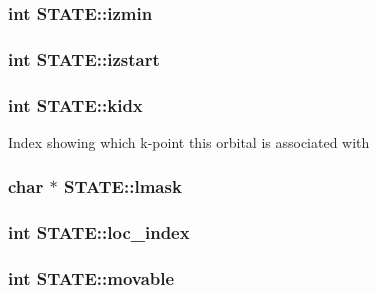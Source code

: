 \hypertarget{struct_s_t_a_t_e_a495ef2ace16d4fc498894d751044967a}{
\subsubsection[{izmin}]{\setlength{\rightskip}{0pt plus 5cm}int S\-T\-A\-T\-E\-::izmin}}\label{struct_s_t_a_t_e_a495ef2ace16d4fc498894d751044967a}
\hypertarget{struct_s_t_a_t_e_afbee51a629af4923533c7fe17fb51488}{
\subsubsection[{izstart}]{\setlength{\rightskip}{0pt plus 5cm}int S\-T\-A\-T\-E\-::izstart}}\label{struct_s_t_a_t_e_afbee51a629af4923533c7fe17fb51488}
\hypertarget{struct_s_t_a_t_e_ab2d8423cf507b9585d85f5b10a27326c}{
\subsubsection[{kidx}]{\setlength{\rightskip}{0pt plus 5cm}int S\-T\-A\-T\-E\-::kidx}}\label{struct_s_t_a_t_e_ab2d8423cf507b9585d85f5b10a27326c}
Index showing which k-\/point this orbital is associated with \hypertarget{struct_s_t_a_t_e_a64bc98507c0a1e0b485c1b5e29bf4595}{
\subsubsection[{lmask}]{\setlength{\rightskip}{0pt plus 5cm}char $\ast$ S\-T\-A\-T\-E\-::lmask}}\label{struct_s_t_a_t_e_a64bc98507c0a1e0b485c1b5e29bf4595}
\hypertarget{struct_s_t_a_t_e_acaca318767587e321bdc410210393e6f}{
\subsubsection[{loc\-\_\-index}]{\setlength{\rightskip}{0pt plus 5cm}int S\-T\-A\-T\-E\-::loc\-\_\-index}}\label{struct_s_t_a_t_e_acaca318767587e321bdc410210393e6f}
\hypertarget{struct_s_t_a_t_e_ab4a1a330cadb70247c06776140f60d29}{
\subsubsection[{movable}]{\setlength{\rightskip}{0pt plus 5cm}int S\-T\-A\-T\-E\-::movable}}\label{struct_s_t_a_t_e_ab4a1a330cadb70247c06776140f60d29}
